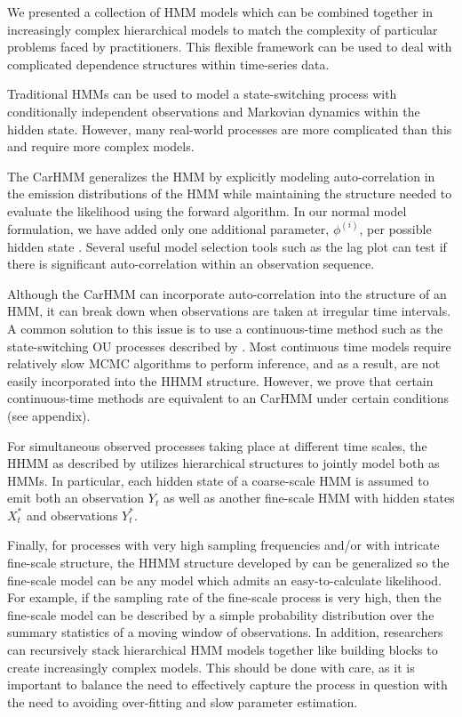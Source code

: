 

We presented a collection of HMM models which can be combined together in increasingly complex hierarchical models to match the complexity of particular problems faced by practitioners. This flexible framework can be used to deal with complicated dependence structures within time-series data.

Traditional HMMs can be used to model a state-switching process with conditionally independent observations and Markovian dynamics within the hidden state. However, many real-world processes are more complicated than this and require more complex models.

The CarHMM generalizes the HMM by explicitly modeling auto-correlation in the emission distributions of the HMM while maintaining the structure needed to evaluate the likelihood using the forward algorithm. In our normal model formulation, we have added only one additional parameter, $\phi^{(i)}$, per possible hidden state \citep{Lawler:2019}. Several useful model selection tools such as the lag plot can test if there is significant auto-correlation within an observation sequence.

Although the CarHMM can incorporate auto-correlation into the structure of an HMM, it can break down when observations are taken at irregular time intervals. A common solution to this issue is to use a continuous-time method such as the state-switching OU processes described by \citep{Michelot:2019}. Most continuous time models require relatively slow MCMC algorithms to perform inference, and as a result, are not easily incorporated into the HHMM structure. However, we prove that certain continuous-time methods are equivalent to an CarHMM under certain conditions (see appendix).

For simultaneous observed processes taking place at different time scales, the HHMM as described by \citep{Barajas:2017,Adam:2019} utilizes hierarchical structures to jointly model both as HMMs. In particular, each hidden state of a coarse-scale HMM is assumed to emit both an observation $Y_t$ as well as another fine-scale HMM with hidden states $X^*_t$ and observations $Y^*_t$. 

Finally, for processes with very high sampling frequencies and/or with intricate fine-scale structure, the HHMM structure developed by \citep{Barajas:2017,Adam:2019} can be generalized so the fine-scale model can be any model which admits an easy-to-calculate likelihood. For example, if the sampling rate of the fine-scale process is very high, then the fine-scale model can be described by a simple probability distribution over the summary statistics of a moving window of observations. In addition, researchers can recursively stack hierarchical HMM models together like building blocks to create increasingly complex models. This should be done with care, as it is important to balance the need to effectively capture the process in question with the need to avoiding over-fitting and slow parameter estimation.

